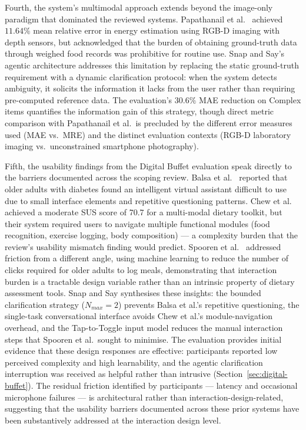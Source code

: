 Fourth, the system's multimodal approach extends beyond the image-only paradigm that dominated the reviewed systems. Papathanail et al.\ \citep{papathanailEvaluationNovelArtificial2021} achieved $11.64\%$ mean relative error in energy estimation using RGB-D imaging with depth sensors, but acknowledged that the burden of obtaining ground-truth data through weighed food records was prohibitive for routine use. Snap and Say's agentic architecture addresses this limitation by replacing the static ground-truth requirement with a dynamic clarification protocol: when the system detects ambiguity, it solicits the information it lacks from the user rather than requiring pre-computed reference data. The evaluation's $30.6\%$ MAE reduction on Complex items quantifies the information gain of this strategy, though direct metric comparison with Papathanail et al.\ is precluded by the different error measures used (MAE vs.\ MRE) and the distinct evaluation contexts (RGB-D laboratory imaging vs.\ unconstrained smartphone photography).

Fifth, the usability findings from the Digital Buffet evaluation speak directly to the barriers documented across the scoping review. Balsa et al.\ \citep{balsaUsabilityIntelligentVirtual2020} reported that older adults with diabetes found an intelligent virtual assistant difficult to use due to small interface elements and repetitive questioning patterns. Chew et al.\ \citep{chewADLDigitalToolkit2025} achieved a moderate SUS score of 70.7 for a multi-modal dietary toolkit, but their system required users to navigate multiple functional modules (food recognition, exercise logging, body composition) --- a complexity burden that the review's usability mismatch finding would predict. Spooren et al.\ \citep{spoorenImprovingRecommendationsMeals2023} addressed friction from a different angle, using machine learning to reduce the number of clicks required for older adults to log meals, demonstrating that interaction burden is a tractable design variable rather than an intrinsic property of dietary assessment tools. Snap and Say synthesises these insights: the bounded clarification strategy ($N_{max}=2$) prevents Balsa et al.'s repetitive questioning, the single-task conversational interface avoids Chew et al.'s module-navigation overhead, and the Tap-to-Toggle input model reduces the manual interaction steps that Spooren et al.\ sought to minimise. The evaluation provides initial evidence that these design responses are effective: participants reported low perceived complexity and high learnability, and the agentic clarification interruption was received as helpful rather than intrusive (Section~\ref{sec:digital-buffet}). The residual friction identified by participants --- latency and occasional microphone failures --- is architectural rather than interaction-design-related, suggesting that the usability barriers documented across these prior systems have been substantively addressed at the interaction design level.

